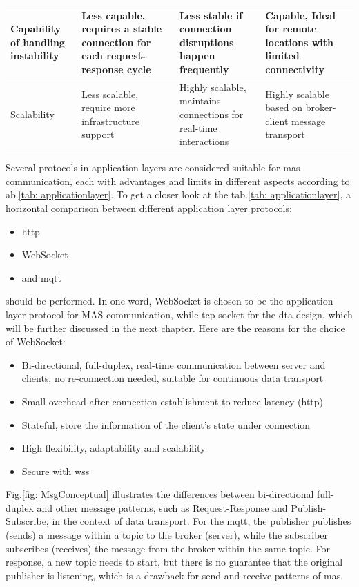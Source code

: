 \begin{table}
\begin{tabular}{|m{}|m{}|m{}|m{}|}
    Capability of handling instability & Less capable, requires a stable connection for each request-response cycle & Less stable if connection disruptions happen frequently & Capable, Ideal for remote locations with limited connectivity \\ \hline
    Scalability & Less scalable, require more infrastructure support & Highly scalable, maintains connections for real-time interactions & Highly scalable based on broker-client message transport \\ \hline
    \end{tabular}
\end{table}

Several protocols in application layers are considered suitable for \gls{mas} 
communication, each with advantages and limits in different aspects according to 
ab.\ref{tab: applicationlayer}.
To get a closer look at the tab.\ref{tab: applicationlayer}, a horizontal comparison 
between different application layer protocols: 


\begin{itemize}
    \item \gls{http}
    \item WebSocket
    \item and \gls{mqtt}
\end{itemize}

should be performed. In one word, WebSocket is chosen to be the application 
layer protocol for MAS communication, while \gls{tcp} socket for the \gls{dta} 
design, which will be further discussed in the next chapter. Here are the 
reasons for the choice of WebSocket: 


\begin{itemize}
    \item Bi-directional, full-duplex, real-time communication between server and clients, no re-connection needed, suitable for continuous data transport
    \item Small overhead after connection establishment to reduce latency (\gls{http})
    \item Stateful, store the information of the client's state under connection
    \item High flexibility, adaptability and scalability
    \item Secure with wss
\end{itemize}

Fig.\ref{fig: MsgConceptual} illustrates the differences between bi-directional full-duplex and other message patterns, such as Request-Response and Publish-Subscribe, in the context of data transport.
For the \gls{mqtt}, the publisher publishes (sends) a message within a topic to the broker (server), while the subscriber subscribes (receives) the message from the broker within the same topic. 
For response, a new topic needs to start, but there is no guarantee that the original publisher is listening, which is a drawback for send-and-receive patterns of \gls{mas}. 

